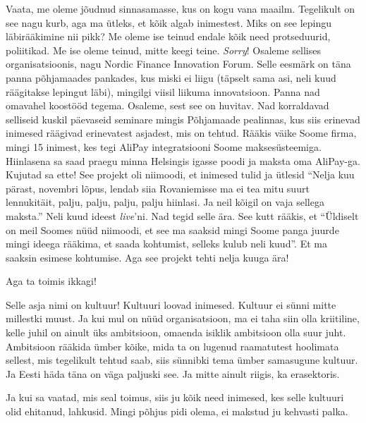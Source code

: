Vaata, me oleme jõudnud sinnasamasse, kus on kogu vana maailm. Tegelikult on 
see nagu kurb, aga ma ütleks, et  kõik algab  inimestest. Miks on see lepingu 
läbirääkimine nii pikk? Me oleme ise teinud endale kõik need protseduurid, 
poliitikad. Me ise oleme teinud, mitte keegi teine. \emph{Sorry}! Osaleme 
sellises organisatsioonis, nagu Nordic Finance Innovation Forum. Selle eesmärk 
on täna panna põhjamaades pankades, kus miski ei liigu (täpselt sama asi, neli 
kuud räägitakse lepingut läbi), mingilgi viisil liikuma innovatsioon. Panna nad 
omavahel koostööd tegema. Osaleme, sest see on huvitav. Nad korraldavad 
selliseid kuskil päevaseid seminare mingis Põhjamaade pealinnas, kus siis 
erinevad inimesed räägivad erinevatest asjadest, mis on tehtud. Rääkis väike 
Soome firma, mingi 15 inimest, kes tegi AliPay integratsiooni Soome 
maksesüsteemiga. Hiinlasena sa saad praegu minna Helsingis igasse poodi ja 
maksta oma AliPay-ga. Kujutad sa ette! See projekt oli niimoodi, et inimesed 
tulid ja ütlesid \enquote{Nelja kuu pärast, novembri lõpus, lendab siia 
Rovaniemisse ma ei tea mitu suurt lennukitäit, palju, palju, palju, palju 
hiinlasi. Ja neil kõigil on vaja sellega maksta.} Neli kuud ideest 
\emph{live}'ni. Nad tegid selle ära. See kutt rääkis, et \enquote{Üldiselt on 
meil Soomes nüüd niimoodi, et see ma saaksid mingi Soome panga juurde mingi 
ideega rääkima, et saada  kohtumist, selleks kulub neli kuud}. Et ma saaksin 
esimese kohtumise. Aga see projekt tehti nelja kuuga ära!


Aga ta toimis ikkagi! 


Selle asja nimi on kultuur! Kultuuri loovad inimesed. Kultuur ei sünni mitte 
millestki muust. Ja kui mul on nüüd organisatsioon, ma ei taha siin olla 
kriitiline, kelle juhil  on ainult  üks ambitsioon, omaenda isiklik ambitsioon 
olla suur juht. Ambitsioon rääkida ümber kõike, mida ta on lugenud raamatutest 
hoolimata sellest, mis tegelikult tehtud saab, siis sünnibki tema ümber 
samasugune kultuur. Ja Eesti häda täna on väga paljuski see. Ja mitte ainult 
riigis, ka erasektoris. 


Ja kui sa vaatad, mis seal toimus, siis ju kõik need inimesed, kes selle 
kultuuri olid ehitanud, lahkusid. Mingi põhjus pidi olema, ei makstud ju 
kehvasti palka.

